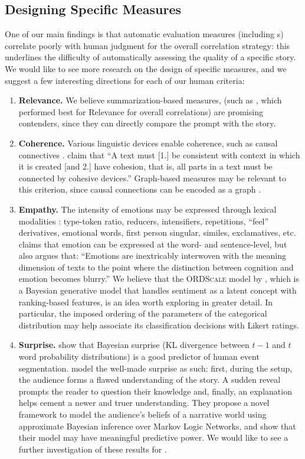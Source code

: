 \subsection{Designing Specific {\asefull} Measures}
One of our main findings is that automatic evaluation measures (including {\llm}s) correlate poorly with human judgment for the overall correlation strategy: this underlines the difficulty of automatically assessing the quality of a specific story. We would like to see more research on the design of specific {\ase} measures, and we suggest a few interesting directions for each of our human criteria:
\begin{enumerate}
    \item \textbf{Relevance.} We believe summarization-based measures, (such as \supert, which performed best for Relevance for overall correlations) are promising contenders, since they can directly compare the prompt with the story.
    \item \textbf{Coherence.} Various linguistic devices enable coherence, such as causal connectives \citep{sanders2007linguistics}. \citet{wang2014short} claim that ``A text must [1.] be consistent with context in which it is created [and 2.] have cohesion, that is, all parts in a text must be connected by cohesive devices.'' Graph-based measures may be relevant to this criterion, since causal connections can be encoded as a graph \citep{xu2019scalable}.
    \item \textbf{Empathy.} The intensity of emotions may be expressed through lexical modalities \citep{argaman2010linguistic}: type-token ratio, reducers, intensifiers, repetitions, ``feel'' derivatives, emotional words, first person singular, similes, exclamatives, etc. \citet{kleres2011emotions} claims that emotion can be expressed at the word- and sentence-level, but also argues that: ``Emotions are inextricably interwoven with the meaning dimension of texts to the point where the distinction between cognition and emotion becomes blurry.'' We believe that the \textsc{ORDScale} model by \citet{stoehr-etal-2023-sentiment}, which is a Bayesian generative model that handles sentiment as a latent concept with ranking-based features, is an idea worth exploring in greater detail. In particular, the imposed ordering of the parameters of the categorical distribution may help associate its classification decisions with Likert ratings.
    \item \textbf{Surprise.} \citet{kumar2022bayesian} show that Bayesian surprise (KL divergence between $t-1$ and $t$ word probability distributions) is a good predictor of human event segmentation. \citet{chieppe2022bayesian} model the well-made surprise as such: first, during the setup, the audience forms a flawed understanding of the story. A sudden reveal prompts the reader to question their knowledge and, finally, an explanation helps cement a newer and truer understanding. They propose a novel framework to model the audience’s beliefs of a narrative world using approximate Bayesian inference over Markov Logic Networks, and show that their model may have meaningful predictive power. We would like to see a further investigation of these results for {\ase}.

\end{enumerate}
